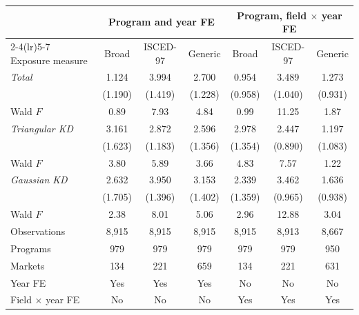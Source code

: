 \begin{tabular}{lcccccc}
\toprule
 & \multicolumn{3}{c}{Program and year FE} & \multicolumn{3}{c}{Program, field \(\times\) year FE} \\
\cmidrule(lr){2-4}\cmidrule(lr){5-7}
Exposure measure & Broad & ISCED-97 & Generic & Broad & ISCED-97 & Generic \\
\midrule
\textit{Total} &  1.124 &  3.994\sym{***} &  2.700\sym{**} &  0.954 &  3.489\sym{***} &  1.273 \\
 & (1.190) & (1.419) & (1.228) & (0.958) & (1.040) & (0.931) \\
\quad Wald \(F\) &  0.89 &  7.93 &  4.84 &  0.99 & 11.25 &  1.87 \\
\addlinespace
\textit{Triangular KD} &  3.161\sym{*} &  2.872\sym{**} &  2.596\sym{*} &  2.978\sym{**} &  2.447\sym{***} &  1.197 \\
 & (1.623) & (1.183) & (1.356) & (1.354) & (0.890) & (1.083) \\
\quad Wald \(F\) &  3.80 &  5.89 &  3.66 &  4.83 &  7.57 &  1.22 \\
\addlinespace
\textit{Gaussian KD} &  2.632 &  3.950\sym{***} &  3.153\sym{**} &  2.339\sym{*} &  3.462\sym{***} &  1.636\sym{*} \\
 & (1.705) & (1.396) & (1.402) & (1.359) & (0.965) & (0.938) \\
\quad Wald \(F\) &  2.38 &  8.01 &  5.06 &  2.96 & 12.88 &  3.04 \\
\midrule
Observations &     8,915 &     8,915 &     8,915 &     8,915 &     8,913 &     8,667 \\
Programs &       979 &       979 &       979 &       979 &       979 &       950 \\
Markets &       134 &       221 &       659 &       134 &       221 &       631 \\
Year FE & Yes & Yes & Yes & No & No & No \\
Field \(\times\) year FE & No & No & No & Yes & Yes & Yes \\
\bottomrule
\end{tabular}

